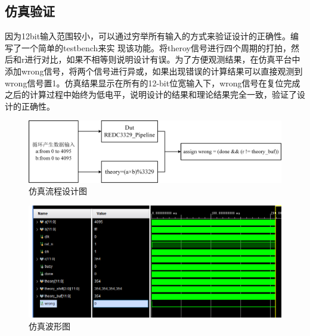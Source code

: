 \documentclass[UTF8]{ctexart}
\begin{document}
\subsection{仿真验证}
因为12bit输入范围较小，可以通过穷举所有输入的方式来验证设计的正确性。编写了一个简单的testbench来实
现该功能。将theroy信号进行四个周期的打拍，然后和r进行对比，如果不相等则说明设计有误。为了方便观测结果，在仿真平台中添加wrong信号，将两个信号进行异或，如果出现错误的计算结果可以直接观测到wrong信号置1。仿真结果显示在所有的12-bit位宽输入下，wrong信号在复位完成之后的计算过程中始终为低电平，说明设计的结果和理论结果完全一致，验证了设计的正确性。
\begin{figure}[H]
	\centering
	\includegraphics[scale=1.2]{sim.png}
	\caption{仿真流程设计图}	
\end{figure}
\begin{figure}[H]
	\centering
	\includegraphics[scale=0.7]{wrong.png}
	\caption{仿真波形图}	
\end{figure}
\end{document}
